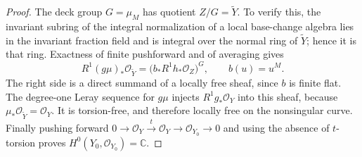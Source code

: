 \begin{proof}
The deck group $G=\mu_M$ has quotient $Z/G=\widetilde Y$.
To verify this, the invariant subring of the integral normalization
of a local base-change algebra lies in the invariant fraction field
and is integral over the normal ring of $\widetilde Y$; hence it is
that ring. Exactness of finite pushforward and of averaging gives
\[
 R^1(g\mu)_*\mathcal O_{\widetilde Y}
   =\bigl(b_*R^1h_*\mathcal O_Z\bigr)^G,
 \qquad b(u)=u^M.
\]
The right side is a direct summand of a locally free sheaf, since
$b$ is finite flat. The degree-one Leray sequence for $g\mu$ injects
$R^1g_*\mathcal O_Y$ into this sheaf, because
$\mu_*\mathcal O_{\widetilde Y}=\mathcal O_Y$. It is torsion-free,
and therefore locally free on the nonsingular curve. Finally pushing
forward $0\to\mathcal O_Y\xrightarrow{t}\mathcal O_Y\to
\mathcal O_{Y_0}\to0$ and using the absence of $t$-torsion proves
$H^0(Y_0,\mathcal O_{Y_0})=\mathbb C$.
\end{proof}



